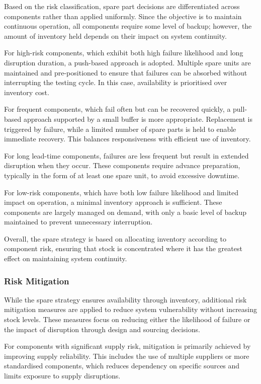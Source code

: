 \documentclass[a4paper,11pt]{article}
\begin{document}
Based on the risk classification, spare part decisions are differentiated across components rather than applied uniformly. Since the objective is to maintain continuous operation, all components require some level of backup; however, the amount of inventory held depends on their impact on system continuity.

For high-risk components, which exhibit both high failure likelihood and long disruption duration, a push-based approach is adopted. Multiple spare units are maintained and pre-positioned to ensure that failures can be absorbed without interrupting the testing cycle. In this case, availability is prioritised over inventory cost.

For frequent components, which fail often but can be recovered quickly, a pull-based approach supported by a small buffer is more appropriate. Replacement is triggered by failure, while a limited number of spare parts is held to enable immediate recovery. This balances responsiveness with efficient use of inventory.

For long lead-time components, failures are less frequent but result in extended disruption when they occur. These components require advance preparation, typically in the form of at least one spare unit, to avoid excessive downtime.

For low-risk components, which have both low failure likelihood and limited impact on operation, a minimal inventory approach is sufficient. These components are largely managed on demand, with only a basic level of backup maintained to prevent unnecessary interruption.

Overall, the spare strategy is based on allocating inventory according to component risk, ensuring that stock is concentrated where it has the greatest effect on maintaining system continuity.

\subsubsection{Risk Mitigation}

While the spare strategy ensures availability through inventory, additional risk mitigation measures are applied to reduce system vulnerability without increasing stock levels. These measures focus on reducing either the likelihood of failure or the impact of disruption through design and sourcing decisions.

For components with significant supply risk, mitigation is primarily achieved by improving supply reliability. This includes the use of multiple suppliers or more standardised components, which reduces dependency on specific sources and limits exposure to supply disruptions.
\end{document}
